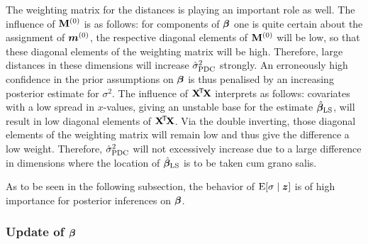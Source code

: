 The weighting matrix for the distances is playing an important role as well.
%
The influence of $\mathbf{M}^{(0)}$ is as follows: for components of $\boldsymbol{\beta}$
one is quite certain about the assignment of ${\bm m}^{(0)}$, the respective diagonal elements
of $\mathbf{M}^{(0)}$ will be low, so that these diagonal elements of the weighting matrix
will be high. Therefore, large distances in these dimensions will increase $\hat{\sigma}^2_\text{PDC}$ strongly.
An erroneously high confidence in the prior assumptions on $\boldsymbol{\beta}$ is thus
penalised by an increasing posterior estimate for $\sigma^2$.
%
The influence of $\mathbf{X}^{{\mbox{\!\scriptsize\textsf{T}}}} \! \mathbf{X}$ interprets as follows: covariates with a low spread
in $x$-values, giving an unstable base for the estimate $\hat{\boldsymbol{\beta}}_\text{LS}$,
will result in low diagonal elements of $\mathbf{X}^{{\mbox{\!\scriptsize\textsf{T}}}} \! \mathbf{X}$.
Via the double inverting, those diagonal elements of the weighting matrix
will remain low and thus give the difference a low weight.
Therefore, $\hat{\sigma}^2_\text{PDC}$ will not excessively increase due to a large difference
in dimensions where the location of $\hat{\boldsymbol{\beta}}_\text{LS}$ is to be taken cum grano salis.

As to be seen in the following subsection, the behavior of $\operatorname{E}[\sigma\mid {\bm z}]$ is of high
importance for posterior inferences on $\boldsymbol{\beta}$.


\subsubsection{Update of \texorpdfstring{$\boldsymbol{\beta}$}{beta}}
\label{sec:scp-update3}

